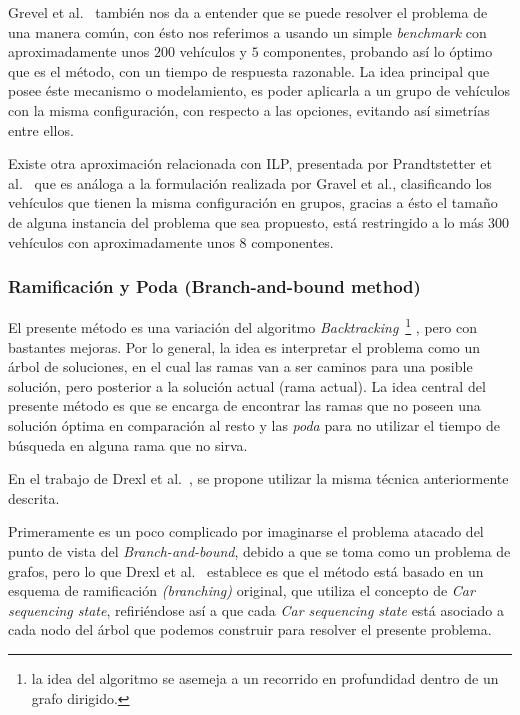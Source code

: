 Grevel et al.~\cite{4} también nos da a entender que se puede resolver el problema
de una manera común, con ésto nos referimos a usando un simple \emph{benchmark}
con aproximadamente unos $200$ vehículos y $5$ componentes, probando así
lo óptimo que es el método, con un tiempo de respuesta razonable.
La idea principal que posee éste mecanismo o modelamiento, es poder aplicarla a un
grupo de vehículos con la misma configuración, con respecto a las opciones,
evitando así simetrías entre ellos.

Existe otra aproximación relacionada con ILP, presentada por Prandtstetter et al.~\cite{12}
que es análoga a la formulación realizada por Gravel et al., clasificando los vehículos
que tienen la misma configuración en grupos, gracias a ésto el tamaño de alguna instancia
del problema que sea propuesto, está restringido a lo más $300$ vehículos con aproximadamente
unos $8$ componentes.

\subsubsection{Ramificación y Poda (Branch-and-bound method)}

El presente método es una variación del algoritmo \emph{Backtracking}~\footnote{
la idea del algoritmo se asemeja a un recorrido en profundidad dentro de un grafo dirigido.
}
, pero con bastantes mejoras.
Por lo general, la idea es interpretar el problema como un árbol de soluciones,
en el cual las ramas van a ser caminos para una posible solución, pero posterior a la solución
actual (rama actual).
La idea central del presente método es que se encarga de encontrar las ramas que no poseen
una solución óptima en comparación al resto y las \emph{poda} para no utilizar el tiempo
de búsqueda en alguna rama que no sirva.

En el trabajo de Drexl et al.~\cite{DKM06}, se propone utilizar la misma técnica anteriormente
descrita.

Primeramente es un poco complicado por imaginarse el problema atacado del punto de vista
del \emph{Branch-and-bound}, debido a que se toma como un problema de grafos, pero lo que
Drexl et al.~\cite{DKM06} establece es que el método está basado en un esquema de ramificación
\emph{(branching)} original, que utiliza el concepto de \emph{Car sequencing state}, 
refiriéndose así a que cada \emph{Car sequencing state} está asociado a cada nodo del árbol
que podemos construir para resolver el presente problema.

